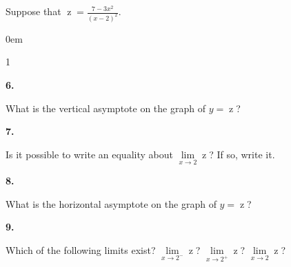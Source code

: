 \documentclass[12pt,]{book}
\theoremstyle{plain}
\theoremstyle{definition}
\numberwithin{equation}{section}
\newenvironment{exercisegroup}%
{\medskip\noindent}%
{\par\bigskip}%
\newlength{\exercisegroupindent}%
\newlength{\exercisegroupitemwidth}%
\newenvironment{exercisegrouplist}%
{\vspace{-\partopsep}%
\begin{adjustwidth}{\exercisegroupindent}{0em}}%
{\end{adjustwidth}%
\vspace{-\partopsep}%
\vspace{\baselineskip}}%
\newenvironment{exercisegroupbycol}[1]%
{\begin{exercisegrouplist}%
\vspace{-\multicolsep}%
\begin{multicols}{#1}%
\setlength{\parindent}{0em}%
\setlength{\exercisegroupitemwidth}{\linewidth}}%
{\end{multicols}%
\vspace{-\multicolsep}%
\end{exercisegrouplist}}%
\newenvironment{exercisegroupitem}[1]%
{\begin{minipage}[t]{\exercisegroupitemwidth}
\vspace{0pt}%
{\bfseries#1}%
\rule{0pt}{\baselineskip}}{\strut%
\end{minipage}%
\hspace{\columnsep}}%
\providecommand\phantomsection{}
\newcommand{\fe}[2]{\mathop{{#1}{\left(#2\right)}}}
\begin{document}
\begin{exercisegroup}%
Suppose that \(\fe{z}{x}=\frac{7-3x^2}{\left(x-2\right)^2}\).%
\par
\begin{exercisegroupbycol}{1}%
\begin{exercisegroupitem}{6. }\phantomsection\hypertarget{exercise-95}{\null}
What is the vertical asymptote on the graph of \(y=\fe{z}{x}\)?%
\end{exercisegroupitem}%
\par%
\begin{exercisegroupitem}{7. }\phantomsection\hypertarget{exercise-96}{\null}
Is it possible to write an equality about \(\lim\limits_{x\to2}\fe{z}{x}\)? If so, write it.%
\end{exercisegroupitem}%
\par%
\begin{exercisegroupitem}{8. }\phantomsection\hypertarget{exercise-97}{\null}
What is the horizontal asymptote on the graph of \(y=\fe{z}{x}\)?%
\end{exercisegroupitem}%
\par%
\begin{exercisegroupitem}{9. }\phantomsection\hypertarget{exercise-98}{\null}
Which of the following limits exist? \(\lim\limits_{x\to2^{-}}\fe{z}{x}\)? \(\lim\limits_{x\to2^{+}}\fe{z}{x}\)? \(\lim\limits_{x\to2}\fe{z}{x}\)?%
\end{exercisegroupitem}%
\par%
\end{exercisegroupbycol}%
\end{exercisegroup}%
\end{document}
